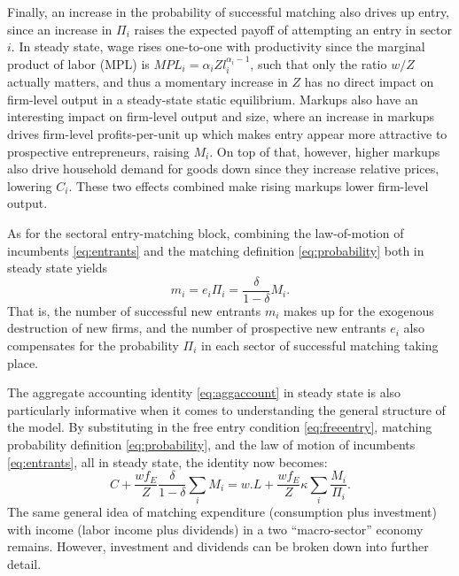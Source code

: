 \documentclass[a4paper,12pt]{article} %
\numberwithin{equation}{section} %
\numberwithin{figure}{section}
\numberwithin{table}{section}
\begin{document}
Finally, an increase in the probability of successful matching also drives up entry, since an increase in $\Pi_i$ raises the expected payoff of attempting
an entry in sector $i$. In steady state, wage rises one-to-one with productivity since the marginal product of labor (MPL) is 
$MPL_i = \alpha_i Z l_i^{\alpha_i -1}$, such that only the ratio $w/Z$ actually matters, and thus a momentary increase in $Z$ has no direct impact
on firm-level output in a steady-state static equilibrium. Markups also have an interesting impact on firm-level output and size, where an increase in 
markups drives firm-level profits-per-unit up which makes entry appear more attractive to prospective entrepreneurs, raising $M_i$.
On top of that, however, higher markups also drive household demand for goods down since they increase relative prices, 
lowering $C_i$. These two effects combined make rising markups lower firm-level output.

As for the sectoral entry-matching block, combining the law-of-motion of incumbents \eqref{eq:entrants} and the matching 
definition \eqref{eq:probability} both in steady state yields 
\begin{equation}
m_i= e_i\Pi_i= \frac{\delta}{1-\delta}M_i. \label{steadyentrants} 
\end{equation}
That is, the number of successful new entrants $m_i$ makes up for the exogenous destruction of new firms, and the 
number of prospective new entrants $e_i$ also compensates for the probability $\Pi_i$ in each sector of successful
matching taking place.

The aggregate accounting identity \eqref{eq:aggaccount} in steady state is also particularly informative when it
comes to understanding the general structure of the model. By substituting in the free entry condition 
\eqref{eq:freeentry}, matching probability definition \eqref{eq:probability}, and the law of motion of incumbents \eqref{eq:entrants}, 
all in steady state, the identity now becomes:
\begin{equation}
C + \frac{w f_E}{Z}\frac{\delta}{1-\delta}\sum_iM_{i}= w.L + \frac{w f_E}{Z}\kappa \sum_i\frac{M_i}{\Pi_i}. \label{aggsteadystate} 
\end{equation}
The same general idea of matching expenditure (consumption plus investment) with income (labor income plus dividends)
in a two ``macro-sector'' economy remains. However, investment and dividends can be broken down into further detail. 
\end{document}

